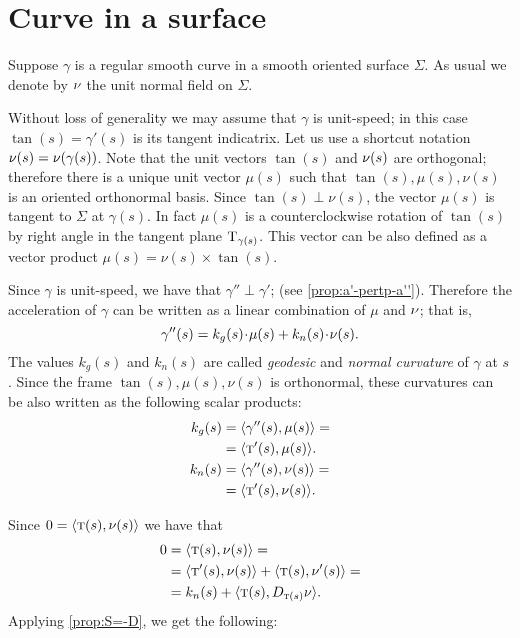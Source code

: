 

\section*{Curve in a surface}

Suppose $\gamma$ is a regular smooth curve in a smooth oriented surface $\Sigma$.
As usual we denote by $\nu$ the unit normal field on $\Sigma$.

Without loss of generality we may assume that $\gamma$ is unit-speed;
in this case $\tan(s)=\gamma'(s)$ is its tangent indicatrix.
Let us use a shortcut notation $\nu(s)=\nu(\gamma(s))$.
Note that the unit vectors $\tan(s)$ and $\nu(s)$ are orthogonal;
therefore there is a unique unit vector $\mu(s)$ such that 
$\tan(s),\mu(s),\nu(s)$ is an oriented orthonormal basis.
Since $\tan(s)\perp\nu(s)$, the vector $\mu(s)$ is tangent to $\Sigma$ at $\gamma(s)$.
In fact $\mu(s)$ is a counterclockwise rotation of $\tan(s)$ by right angle in the tangent plane $\mathrm{T}_{\gamma(s)}$.
This vector can be also defined as a vector product $\mu(s)=\nu(s)\times \tan(s)$. %

Since $\gamma$ is unit-speed, we have that $\gamma''\perp \gamma'$; (see \ref{prop:a'-pertp-a''}).
Therefore the acceleration of $\gamma$ can be written as a linear combination of $\mu$ and $\nu$;
that is,
\[\gamma''(s)=k_g(s)\cdot \mu(s)+k_n(s)\cdot\Norm(s).\]
The values $k_g(s)$ and $k_n(s)$ are called \emph{geodesic} and \emph{normal curvature} of $\gamma$ at $s$.
Since the frame $\tan(s),\mu(s),\nu(s)$ is orthonormal, these curvatures can be also written as the following scalar products:
\begin{align*}
k_g(s)&=\langle \gamma''(s),\mu(s)\rangle
=
\\
&=\langle \textsc{t}'(s),\mu(s)\rangle.
\\
k_n(s)&=\langle \gamma''(s),\nu(s)\rangle=
\\
&=\langle \textsc{t}'(s),\nu(s)\rangle.
\end{align*}

Since $0=\langle \textsc{t}(s),\nu(s)\rangle$ we have 
that 
\begin{align*}
0&=\langle \textsc{t}(s),\nu(s)\rangle=
\\
&=\langle \textsc{t}'(s),\nu(s)\rangle+\langle \textsc{t}(s),\nu'(s)\rangle=
\\
&=k_n(s)+\langle \textsc{t}(s),D_{\textsc{t}(s)}\nu\rangle.
\end{align*}
Applying \ref{prop:S=-D},  we get the following:

